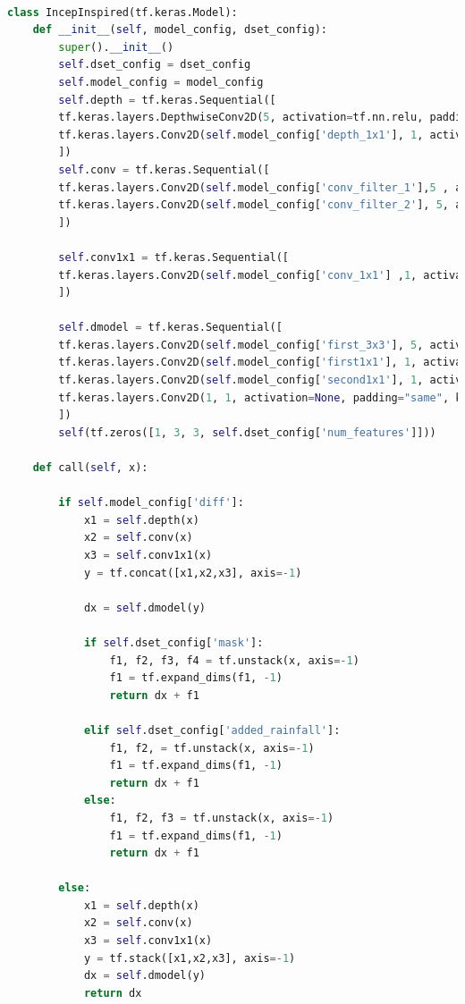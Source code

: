 \begin{lstlisting}[language=Python, label={lst:4}]
	
class IncepInspired(tf.keras.Model):
	def __init__(self, model_config, dset_config):
		super().__init__()
		self.dset_config = dset_config
		self.model_config = model_config
		self.depth = tf.keras.Sequential([
		tf.keras.layers.DepthwiseConv2D(5, activation=tf.nn.relu, padding="same", depth_multiplier=self.model_config['depth']),
		tf.keras.layers.Conv2D(self.model_config['depth_1x1'], 1, activation=tf.nn.relu, padding="same")
		])
		self.conv = tf.keras.Sequential([
		tf.keras.layers.Conv2D(self.model_config['conv_filter_1'],5 , activation=tf.nn.relu, padding="same"),
		tf.keras.layers.Conv2D(self.model_config['conv_filter_2'], 5, activation=tf.nn.relu, padding="same"),
		])
		
		self.conv1x1 = tf.keras.Sequential([
		tf.keras.layers.Conv2D(self.model_config['conv_1x1'] ,1, activation=tf.nn.relu, padding="same"),
		])
		
		self.dmodel = tf.keras.Sequential([
		tf.keras.layers.Conv2D(self.model_config['first_3x3'], 5, activation=tf.nn.relu, padding="same"),
		tf.keras.layers.Conv2D(self.model_config['first1x1'], 1, activation=tf.nn.relu, padding="same"),
		tf.keras.layers.Conv2D(self.model_config['second1x1'], 1, activation=tf.nn.relu, padding="same"),
		tf.keras.layers.Conv2D(1, 1, activation=None, padding="same", kernel_initializer=tf.zeros_initializer)
		])
		self(tf.zeros([1, 3, 3, self.dset_config['num_features']]))
	
	def call(self, x):
	
		if self.model_config['diff']:
			x1 = self.depth(x)
			x2 = self.conv(x)
			x3 = self.conv1x1(x)
			y = tf.concat([x1,x2,x3], axis=-1)
			
			dx = self.dmodel(y)
			
			if self.dset_config['mask']:
				f1, f2, f3, f4 = tf.unstack(x, axis=-1)
				f1 = tf.expand_dims(f1, -1)
				return dx + f1
			
			elif self.dset_config['added_rainfall']:
				f1, f2, = tf.unstack(x, axis=-1)
				f1 = tf.expand_dims(f1, -1)
				return dx + f1
			else:
				f1, f2, f3 = tf.unstack(x, axis=-1)
				f1 = tf.expand_dims(f1, -1)
				return dx + f1
		
		else:
			x1 = self.depth(x)
			x2 = self.conv(x)
			x3 = self.conv1x1(x)
			y = tf.stack([x1,x2,x3], axis=-1)
			dx = self.dmodel(y)
			return dx
	
\end{lstlisting}

